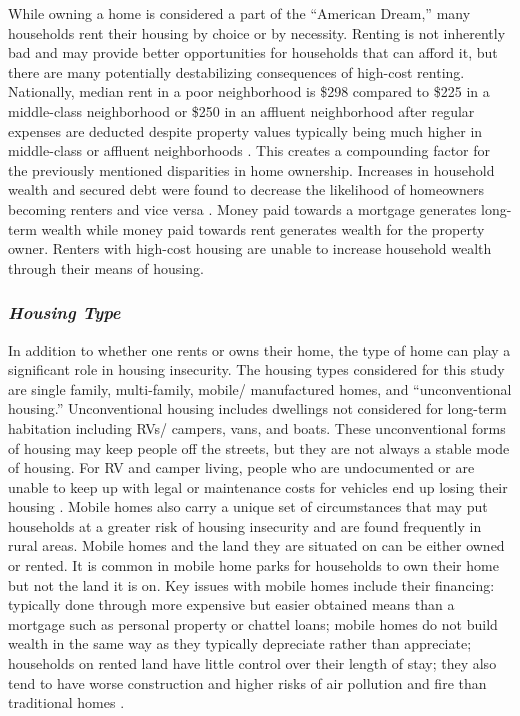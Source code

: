 While owning a home is considered a part of the “American Dream,” many households rent their housing by choice or by necessity. Renting is not inherently bad and may provide better opportunities for households that can afford it, but there are many potentially destabilizing consequences of high-cost renting. Nationally, median rent in a poor neighborhood is \$298 compared to \$225 in a middle-class neighborhood or \$250 in an affluent neighborhood after regular expenses are deducted despite property values typically being much higher in middle-class or affluent neighborhoods \citep{desmond_poor_2019}. This creates a compounding factor for the previously mentioned disparities in home ownership. Increases in household wealth and secured debt were found to decrease the likelihood of homeowners becoming renters and vice versa \citep{anderson_effect_2021}. Money paid towards a mortgage generates long-term wealth while money paid towards rent generates wealth for the property owner. Renters with high-cost housing are unable to increase household wealth through their means of housing.  

\subsubsection{\textit{Housing Type}} 
In addition to whether one rents or owns their home, the type of home can play a significant role in housing insecurity. The housing types considered for this study are single family, multi-family, mobile/ manufactured homes, and “unconventional housing.” Unconventional housing includes dwellings not considered for long-term habitation including RVs/ campers, vans, and boats. These unconventional forms of housing may keep people off the streets, but they are not always a stable mode of housing. For RV and camper living, people who are undocumented or are unable to keep up with legal or maintenance costs for vehicles end up losing their housing \citep{wakin_not_2005}. Mobile homes also carry a unique set of circumstances that may put households at a greater risk of housing insecurity and are found frequently in rural areas. Mobile homes and the land they are situated on can be either owned or rented. It is common in mobile home parks for households to own their home but not the land it is on. Key issues with mobile homes include their financing: typically done through more expensive but easier obtained means than a mortgage such as personal property or chattel loans; mobile homes do not build wealth in the same way as they typically depreciate rather than appreciate; households on rented land have little control over their length of stay; they also tend to have worse construction and higher risks of air pollution and fire than traditional homes \citep{mactavish_wrong_2007}. 

